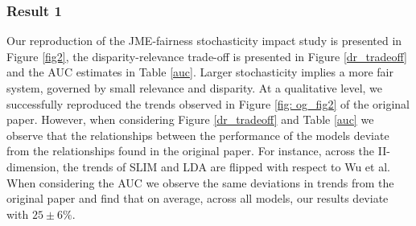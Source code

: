 \subsubsection{Result 1} Our reproduction of the JME-fairness stochasticity impact study is presented in Figure \ref{fig2}, the disparity-relevance trade-off is presented in Figure \ref{dr_tradeoff} and the AUC estimates in Table \ref{auc}. Larger stochasticity implies a more fair system, governed by small relevance and disparity. At a qualitative level, we successfully reproduced the trends observed in Figure \ref{fig: og_fig2} of the original paper. However, when considering Figure \ref{dr_tradeoff} and Table \ref{auc} we observe that the relationships between the performance of the models deviate from the relationships found in the original paper. For instance, across the II-dimension, the trends of SLIM and LDA are flipped with respect to Wu et al. When considering the AUC we observe the same deviations in trends from the original paper and find that on average, across all models, our results deviate with $25\pm6\%$. 

